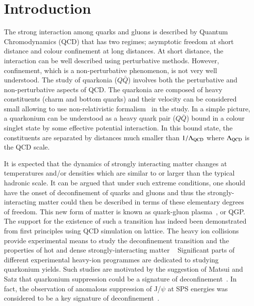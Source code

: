 \newpage
\section{Introduction}
\label{sec:Introduction}


The strong interaction among quarks and gluons is described by
Quantum Chromodynamics (QCD) that has two regimes; asymptotic freedom at short
distance and colour confinement at long distances.
At short distance, the interaction can be well described using perturbative methods. 
However, confinement, which is a non-perturbative phenomenon, is not 
very well understood. The study of quarkonia ($Q\bar{Q}$) involves
both the perturbative and non-perturbative aspects of QCD. 
The quarkonia are composed of heavy constituents (charm and bottom quarks) and their
velocity can be considered small allowing to use 
non-relativistic formalism~\cite{Povh:1995mua,Ikhdair:2005jf} in the study. 
In a simple picture,  a quarkonium can be understood as a heavy quark pair ($Q\bar{Q}$)
bound in a colour singlet state by some effective potential interaction.
In this bound state, the constituents are separated by distances much smaller
than $1/\Lambda_{\rm QCD}$ where $\Lambda_{\rm QCD}$ is the QCD scale.


It is expected that the dynamics of strongly interacting matter changes
at temperatures and/or densities which are similar to or larger than
the typical hadronic scale.
It can be argued that under such extreme conditions, 
one should have the onset of deconfinement of quarks and gluons  and thus the 
strongly-interacting matter could then be described in terms of these
elementary degrees of freedom.
This new form of matter is known as 
quark-gluon plasma~\cite{Shuryak:1980tp,Satz:2011wf}, or QGP.
The support for the existence of such a transition has indeed been demonstrated 
from first principles using QCD simulation on lattice.
The heavy ion collisions provide experimental means to study the deconfinement transition 
and the properties of hot and dense strongly-interacting matter ~\cite{Satz:2000bn}
Significant parts of different experimental heavy-ion
programmes are dedicated to studying quarkonium yields. Such studies are 
motivated by the suggestion of  Matsui and Satz
that quarkonium suppression could be a signature of 
deconfinement~\cite{Matsui:1986dk}.
In fact, the observation of anomalous suppression of J/$\psi$ at SPS energies
was considered to be a key signature of deconfinement~\cite{Kluberg:2005yh}.


